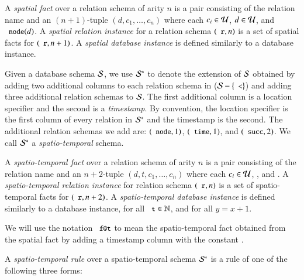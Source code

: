 A {\em spatial fact} over a relation schema of arity $n$ is a pair consisting of the relation name and an $(n+1)$-tuple $(d,c_1,\ldots,c_n)$ where each $c_i \in \univ$, $d \in \univ$, and $\dedalus{node}(d)$.  
A {\em spatial relation instance} for a relation schema $(\dedalus{r},n)$ is a set of spatial facts for $(\dedalus{r},n+1)$.
A {\em spatial database instance} is defined similarly to a database instance.

Given a database schema $\schema$, we use $\stschema$ to denote the extension of
$\schema$ obtained by adding two additional columns to each relation schema in ($\schema - \{\dedalus{<}\}$) and adding three additional relation schemas to $\schema$. 
The first additional column is a location specifier and the second is a {\em timestamp}.  By convention, the location specifier is the first column of every relation in $\stschema$ and the timestamp is the second.  
The additional relation schemas we add are: $(\dedalus{node},1)$,
$(\dedalus{time},1)$, and $(\dedalus{succ},2)$.%
We call $\stschema$ a {\em spatio-temporal} schema.

A {\em spatio-temporal fact} over a relation schema of arity $n$ is a pair consisting of the relation name and an $n+2$-tuple $(d,t,c_1,\ldots,c_n)$ where each $c_i \in \univ$, , and .  A {\em spatio-temporal relation instance} for relation schema $(\dedalus{r},n)$ is a set of spatio-temporal facts for
$(\dedalus{r},n+2)$.  A {\em spatio-temporal database instance} is defined similarly to a database instance,  for all $\dedalus{t} \in \mathbb{N}$, and  for all $y = x + 1$.%

We will use the notation $\dedalus{f@t}$ to mean the spatio-temporal fact obtained from the spatial fact  by adding a timestamp column with the constant .

A {\em spatio-temporal rule} over a spatio-temporal schema $\stschema$ is a rule of one of the following three forms:

